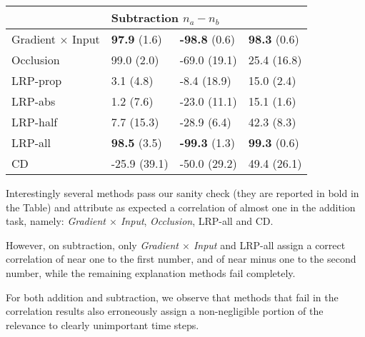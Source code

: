 \documentclass[runningheads]{llncs}
\begin{document}
\begin{table}[t!]
\begin{tabular}{ m{2.6cm} m{2.2cm} m{2.2cm} m{2.2cm}}
		           & \multicolumn{3}{l}{Subtraction $n_a-n_b$ }                                                                                                                                        \\\midrule
		Gradient $\times$ Input 		& \textbf{97.9} {\tiny(1.6)}	            & \textbf{-98.8} {\tiny(0.6)}         	    & \textbf{98.3} {\tiny(0.6)}					                                            \\	
		Occlusion 				        & 99.0 {\tiny(2.0)}			                & -69.0 {\tiny(19.1)}					    & 25.4 {\tiny(16.8)} 						                                                \\	 
		{LRP-prop}		                & 3.1 {\tiny(4.8)} 					        & -8.4 {\tiny(18.9)}			            & 15.0 {\tiny(2.4)}						                                                    \\
		{LRP-abs}		                & 1.2 {\tiny(7.6)} 					        & -23.0 {\tiny(11.1)}					    & 15.1 {\tiny(1.6)}								                                            \\
		{LRP-half}	                    & 7.7 {\tiny(15.3)} 			            & -28.9 {\tiny(6.4)}			            & 42.3 {\tiny(8.3)}						                                                    \\
		{LRP-all}		                & \textbf{98.5} {\tiny(3.5)}			    & \textbf{-99.3} {\tiny(1.3)}	            & \textbf{99.3} {\tiny(0.6)}				                                                \\	 
		CD					            & -25.9 {\tiny(39.1)}					    & -50.0 {\tiny(29.2)}					    & 49.4 {\tiny(26.1)} 						                                                \\	 
	\end{tabular}

	\label{Arr:tab:faithfulness_experiment}
\end{table}

Interestingly several methods pass our sanity check (they are reported in bold in the Table) and attribute as expected a correlation of almost one in the addition task, namely: {\it Gradient $\times$ Input}, {\it Occlusion}, LRP-all and {CD}.

However, on subtraction, only {\it Gradient $\times$ Input} and LRP-all assign a correct correlation of near one to the first number, and of near minus one to the second number, while the remaining explanation methods fail completely.

For both addition and subtraction, we observe that methods that fail in the correlation results also erroneously assign a non-negligible portion of the relevance to clearly unimportant time steps.
\end{document}
